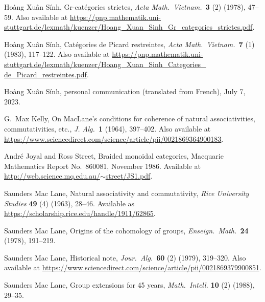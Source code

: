 \documentclass[reqno]{amsart}
\theoremstyle{definition}
\begin{document}
\begin{thebibliography}{99}
Ho\`ang Xu\^an S\'inh,  Gr-cat\'egories strictes, \textsl{Acta Math.\ Vietnam.\ }\textbf{3} (2) (1978), 47--59.  Also available at \href{https://pnp.mathematik.uni-stuttgart.de/lexmath/kuenzer/Hoang_Xuan_Sinh_Gr_categories_strictes.pdf}{https://pnp.mathematik.uni-stuttgart.de/lexmath/kuenzer/Hoang\_Xuan\_Sinh\_Gr\_categories\_strictes.pdf}.

Ho\`ang Xu\^an S\'inh,  
Cat\'egories de Picard restreintes, \textsl{Acta Math.\ Vietnam.\ }\textbf{7} (1) (1983), 117--122.   Also available at  \href{https://pnp.mathematik.uni-stuttgart.de/lexmath/kuenzer/Hoang_Xuan_Sinh_Categories_de_Picard_restreintes.pdf}{https://pnp.mathematik.uni-stuttgart.de/lexmath/kuenzer/Hoang\_Xuan\_Sinh\_Categories\_} \break
\href{https://pnp.mathematik.uni-stuttgart.de/lexmath/kuenzer/Hoang_Xuan_Sinh_Categories_de_Picard_restreintes.pdf}{de\_Picard\_restreintes.pdf}.

Ho\`ang Xu\^an S\'inh,  personal communication (translated from French), July 7, 2023.

G.\ Max Kelly, On MacLane’s conditions for coherence of natural associativities, commutativities, etc., \textsl{J. Alg.\ }\textbf{1} (1964), 397--402.  Also available at
\href{https://www.sciencedirect.com/science/article/pii/0021869364900183}{https://www.sciencedirect.com/science/article/pii/0021869364900183}.

Andr\'e Joyal and Ross Street, Braided monoidal categories,
Macquarie Mathematics Report No.\ 860081, November 1986.  Available
at \href{http://web.science.mq.edu.au/~street/JS1.pdf}{http://web.science.mq.edu.au/$\sim$street/JS1.pdf}.

Saunders  Mac Lane, Natural associativity and commutativity, \textsl{Rice University Studies} \textbf{49} (4) (1963), 28--46.  Available as \href{https://scholarship.rice.edu/handle/1911/62865}{https://scholarship.rice.edu/handle/1911/62865}.

Saunders Mac Lane, Origins of the cohomology of groups, \textsl{Enseign.\ Math.\ }\textbf{24} (1978), 191--219.

Saunders Mac Lane, Historical note, \textsl{Jour.\ Alg.\ }\textbf{60} (2) (1979), 319--320.  Also available at \hfill \break \href{https://www.sciencedirect.com/science/article/pii/0021869379900851}{https://www.sciencedirect.com/science/article/pii/0021869379900851}.

Saunders Mac Lane, Group extensions for 45 years, \textsl{Math.\ Intell.} \textbf{10} (2) (1988), 29--35.


\end{thebibliography}
\end{document}
